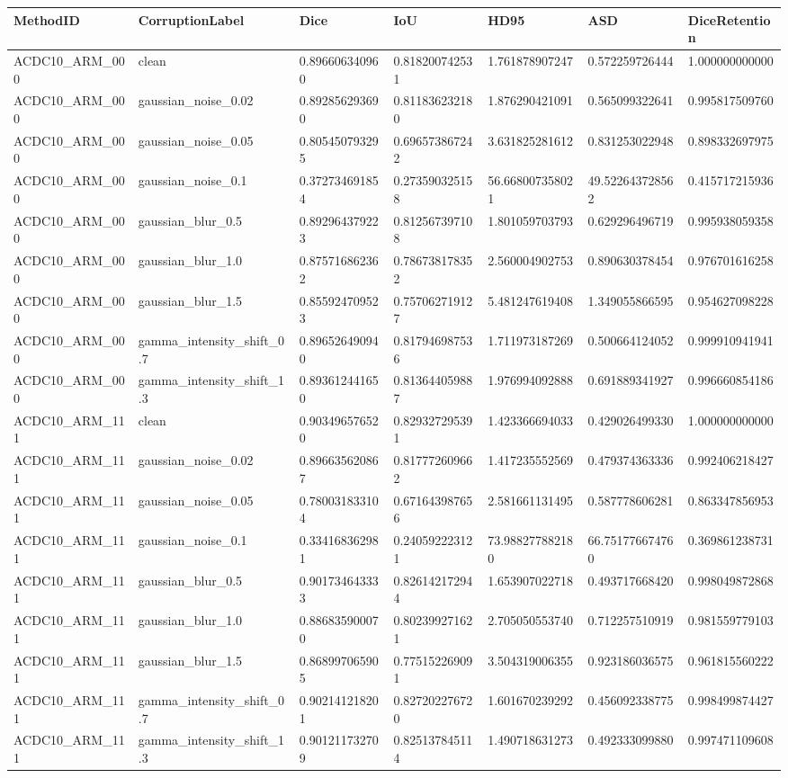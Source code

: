 \begin{tabular}{lllllll}
\toprule
MethodID & CorruptionLabel & Dice & IoU & HD95 & ASD & DiceRetention \\
\midrule
ACDC10_ARM_000 & clean & 0.896606340960 & 0.818200742531 & 1.761878907247 & 0.572259726444 & 1.000000000000 \\
ACDC10_ARM_000 & gaussian_noise_0.02 & 0.892856293690 & 0.811836232180 & 1.876290421091 & 0.565099322641 & 0.995817509760 \\
ACDC10_ARM_000 & gaussian_noise_0.05 & 0.805450793295 & 0.696573867242 & 3.631825281612 & 0.831253022948 & 0.898332697975 \\
ACDC10_ARM_000 & gaussian_noise_0.1 & 0.372734691854 & 0.273590325158 & 56.668007358021 & 49.522643728562 & 0.415717215936 \\
ACDC10_ARM_000 & gaussian_blur_0.5 & 0.892964379223 & 0.812567397108 & 1.801059703793 & 0.629296496719 & 0.995938059358 \\
ACDC10_ARM_000 & gaussian_blur_1.0 & 0.875716862362 & 0.786738178352 & 2.560004902753 & 0.890630378454 & 0.976701616258 \\
ACDC10_ARM_000 & gaussian_blur_1.5 & 0.855924709523 & 0.757062719127 & 5.481247619408 & 1.349055866595 & 0.954627098228 \\
ACDC10_ARM_000 & gamma_intensity_shift_0.7 & 0.896526490940 & 0.817946987536 & 1.711973187269 & 0.500664124052 & 0.999910941941 \\
ACDC10_ARM_000 & gamma_intensity_shift_1.3 & 0.893612441650 & 0.813644059887 & 1.976994092888 & 0.691889341927 & 0.996660854186 \\
ACDC10_ARM_111 & clean & 0.903496576520 & 0.829327295391 & 1.423366694033 & 0.429026499330 & 1.000000000000 \\
ACDC10_ARM_111 & gaussian_noise_0.02 & 0.896635620867 & 0.817772609662 & 1.417235552569 & 0.479374363336 & 0.992406218427 \\
ACDC10_ARM_111 & gaussian_noise_0.05 & 0.780031833104 & 0.671643987656 & 2.581661131495 & 0.587778606281 & 0.863347856953 \\
ACDC10_ARM_111 & gaussian_noise_0.1 & 0.334168362981 & 0.240592223121 & 73.988277882180 & 66.751776674760 & 0.369861238731 \\
ACDC10_ARM_111 & gaussian_blur_0.5 & 0.901734643333 & 0.826142172944 & 1.653907022718 & 0.493717668420 & 0.998049872868 \\
ACDC10_ARM_111 & gaussian_blur_1.0 & 0.886835900070 & 0.802399271621 & 2.705050553740 & 0.712257510919 & 0.981559779103 \\
ACDC10_ARM_111 & gaussian_blur_1.5 & 0.868997065905 & 0.775152269091 & 3.504319006355 & 0.923186036575 & 0.961815560222 \\
ACDC10_ARM_111 & gamma_intensity_shift_0.7 & 0.902141218201 & 0.827202276720 & 1.601670239292 & 0.456092338775 & 0.998499874427 \\
ACDC10_ARM_111 & gamma_intensity_shift_1.3 & 0.901211732709 & 0.825137845114 & 1.490718631273 & 0.492333099880 & 0.997471109608 \\
\bottomrule
\end{tabular}

